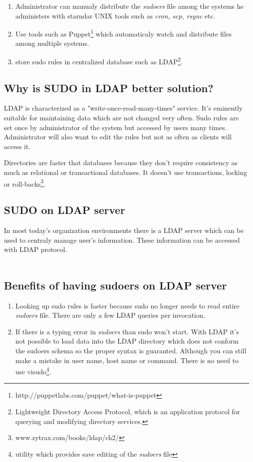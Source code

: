 \documentclass[12pt,a4paper,titlepage,final]{article}
\begin{document}
\begin{enumerate} 
	\item Administrator can manualy distribute the \emph{sudoers} file among the
		systems he administers with starndar UNIX tools such as \emph{cron, scp,
		rsync} etc.
	\item Use tools such as
		Puppet\footnote{http://puppetlabs.com/puppet/what-is-puppet} which
		automaticaly watch and distribute files among multiple systems.
	\item store sudo rules in centralized database such as
		LDAP\footnote{Lightweight Directory Access Protocol, which is an application
		protocol for querying and modifying directory services.}.
\end{enumerate}

\subsection{Why is SUDO in LDAP better solution?}
LDAP is characterized as a "write-once-read-many-times" service. It's eminently
suitable for maintaining data which are not changed very often. Sudo rules are
set once by administrator of the system but accessed by users many times.
Administrator will also want to edit the rules but not as often as clients will
access it.

Directories are faster that databases because they don't require consistency as
much as relational or transactional databases. It doesn't use transactions,
locking or roll-backs\footnote{www.zytrax.com/books/ldap/ch2/}.


\subsection{SUDO on LDAP server}
In most today's organization environments there is a LDAP server which can be
used to centraly manage user's information. These information can be accessed
with LDAP protocol.
\\\\
{\color{blue}{Explain meaning of all sudo LDAP attributes?}}

\subsection{Benefits of having sudoers on LDAP server}
\begin{enumerate} 
	\item Looking up sudo rules is faster because sudo no longer needs to read
		entire \emph{sudoers} file. There are only a few LDAP queries per
		invocation.
	\item If there is a typing error in \emph{sudoers} than sudo won't start. With
		LDAP it's not possible to load data into the LDAP directory which does not
		conform the sudoers schema so the proper syntax is guaranted. Although you
		can still make a mistake in user name, host name or command. There is no
		need to use visudo\footnote{utility which provides save editing of the
		\emph{sudoers} file}.
\end{enumerate}
\end{document}
